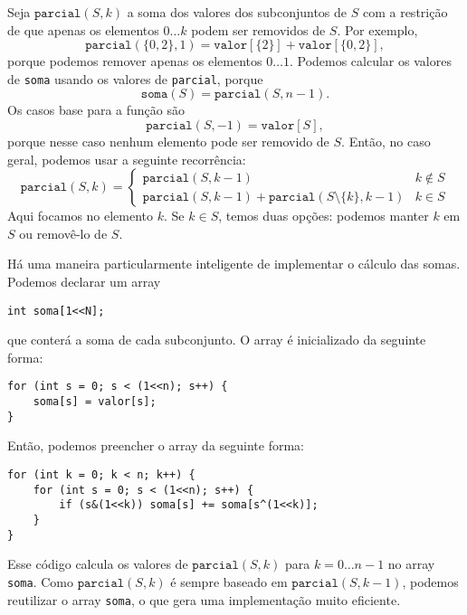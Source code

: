 Seja $\texttt{parcial}(S,k)$ a soma dos
valores dos subconjuntos de $S$ com a restrição
de que apenas os elementos $0 \ldots k$
podem ser removidos de $S$.
Por exemplo,
\[\texttt{parcial}(\{0,2\},1)=\texttt{valor}[\{2\}]+\texttt{valor}[\{0,2\}],\]
porque podemos remover apenas os elementos $0 \ldots 1$.
Podemos calcular os valores de \texttt{soma} usando
os valores de \texttt{parcial}, porque
\[\texttt{soma}(S) = \texttt{parcial}(S,n-1).\]
Os casos base para a função são
\[\texttt{parcial}(S,-1)=\texttt{valor}[S],\]
porque nesse caso nenhum elemento pode ser removido de $S$.
Então, no caso geral, podemos usar a seguinte recorrência:
\begin{equation*}
    \texttt{parcial}(S,k) = \begin{cases}
               \texttt{parcial}(S,k-1) & k \notin S \\
               \texttt{parcial}(S,k-1) + \texttt{parcial}(S \setminus \{k\},k-1) & k \in S
           \end{cases}
\end{equation*}
Aqui focamos no elemento $k$.
Se $k \in S$, temos duas opções: podemos manter $k$ em $S$
ou removê-lo de $S$.

Há uma maneira particularmente inteligente de implementar o
cálculo das somas. Podemos declarar um array
\begin{lstlisting}
int soma[1<<N];
\end{lstlisting}
que conterá a soma de cada subconjunto.
O array é inicializado da seguinte forma:
\begin{lstlisting}
for (int s = 0; s < (1<<n); s++) {
    soma[s] = valor[s];
}
\end{lstlisting}
Então, podemos preencher o array da seguinte forma:
\begin{lstlisting}
for (int k = 0; k < n; k++) {
    for (int s = 0; s < (1<<n); s++) {
        if (s&(1<<k)) soma[s] += soma[s^(1<<k)];
    }
}
\end{lstlisting}
Esse código calcula os valores de $\texttt{parcial}(S,k)$
para $k=0 \ldots n-1$ no array \texttt{soma}.
Como $\texttt{parcial}(S,k)$ é sempre baseado em
$\texttt{parcial}(S,k-1)$, podemos reutilizar o array
\texttt{soma}, o que gera uma implementação muito eficiente.

